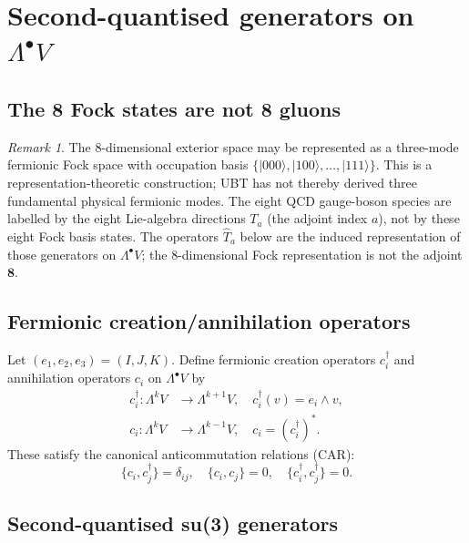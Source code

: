 \documentclass[12pt,a4paper]{article}
\theoremstyle{definition}
\theoremstyle{remark}
\newtheorem{remark}[theorem]{Remark}
\begin{document}
\section{Second-quantised generators on $\Lambda^\bullet V$}
\label{sec:fock}

\subsection{The 8 Fock states are not 8 gluons}

\begin{remark}\label{rem:states_not_gluons}
The $8$-dimensional exterior space may be represented as a three-mode
fermionic Fock space with occupation basis
$\{|000\rangle,|100\rangle,\ldots,|111\rangle\}$.  This is a
representation-theoretic construction; UBT has not thereby derived three
fundamental physical fermionic modes.  The eight QCD gauge-boson species are
labelled by the eight Lie-algebra directions $T_a$ (the adjoint index $a$), not
by these eight Fock basis states.  The operators $\hat T_a$ below are the
induced representation of those generators on $\Lambda^\bullet V$; the
$8$-dimensional Fock representation is not the adjoint $\mathbf 8$.
\end{remark}

\subsection{Fermionic creation/annihilation operators}

Let $(e_1,e_2,e_3) = (I,J,K)$.  Define fermionic creation operators
$c_i^\dagger$ and annihilation operators $c_i$ on $\Lambda^\bullet V$ by
\begin{align}
  c_i^\dagger : \Lambda^k V &\to \Lambda^{k+1} V, \quad
    c_i^\dagger (v) = e_i \wedge v,\\
  c_i : \Lambda^k V &\to \Lambda^{k-1} V, \quad
    c_i = (c_i^\dagger)^*.
\end{align}
These satisfy the canonical anticommutation relations (CAR):
\begin{equation}
  \{c_i, c_j^\dagger\} = \delta_{ij},\quad
  \{c_i, c_j\} = 0,\quad
  \{c_i^\dagger, c_j^\dagger\} = 0.
\end{equation}

\subsection{Second-quantised su(3) generators}
\end{document}
